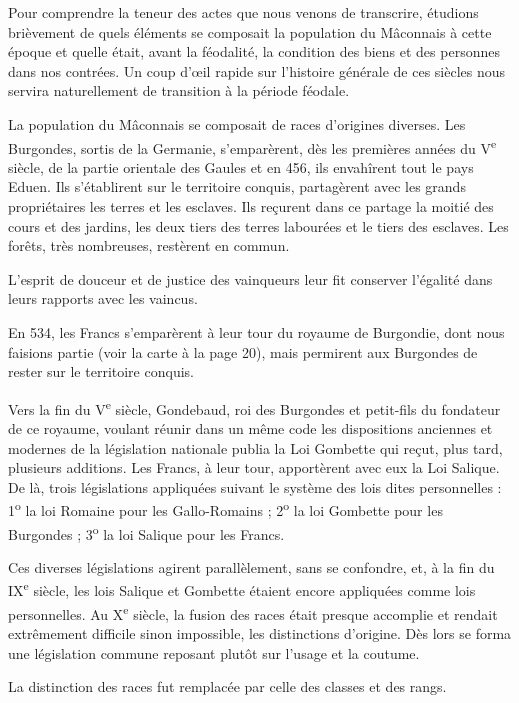 \documentclass[11pt,a4paper]{report}
\begin{document}
Pour comprendre la teneur des actes que nous venons de transcrire, étudions
brièvement de quels éléments se composait la population du Mâconnais à cette
époque et quelle était, avant la féodalité, la condition des biens et des
personnes dans nos contrées. Un coup d'œil rapide sur l'histoire générale de ces
siècles nous servira naturellement de transition à la période féodale.

La population du Mâconnais se composait de races d'origines diverses. Les
Burgondes, sortis de la Germanie, s'emparèrent, dès les premières années du
V\textsuperscript{e} siècle, de la partie orientale des Gaules et en 456, ils
envahîrent tout le pays Eduen. Ils s'établirent sur le territoire conquis,
partagèrent avec les grands propriétaires les terres et les esclaves. Ils
reçurent dans ce partage la moitié des cours et des jardins, les deux tiers des
terres labourées et le tiers des esclaves. Les forêts, très nombreuses, restèrent
en commun.

L'esprit de douceur et de justice des vainqueurs leur fit conserver l'égalité
dans leurs rapports avec les vaincus.

En 534, les Francs s'emparèrent à leur tour du royaume de Burgondie, dont nous
faisions partie (voir la carte à la page 20), mais permirent aux Burgondes de
rester sur le territoire conquis.

Vers la fin du V\textsuperscript{e} siècle, Gondebaud, roi des Burgondes et
petit-fils du fondateur de ce royaume, voulant réunir dans un même code les
dispositions anciennes et modernes de la législation nationale publia la Loi
Gombette qui reçut, plus tard, plusieurs additions. Les Francs, à leur tour,
apportèrent avec eux la Loi Salique. De là, trois législations appliquées suivant
le système des lois dites personnelles : 1\textsuperscript{o} la loi Romaine pour
les Gallo-Romains ; 2\textsuperscript{o} la loi Gombette pour les Burgondes ;
3\textsuperscript{o} la loi Salique pour les Francs.

Ces diverses législations agirent parallèlement, sans se confondre, et, à la fin
du IX\textsuperscript{e} siècle, les lois Salique et Gombette étaient encore
appliquées comme lois personnelles. Au X\textsuperscript{e} siècle, la fusion
des races était presque accomplie et rendait extrêmement difficile sinon
impossible, les distinctions d'origine. Dès lors se forma une législation
commune reposant plutôt sur l'usage et la coutume.

La distinction des races fut remplacée par celle des classes et des rangs.
\end{document}
